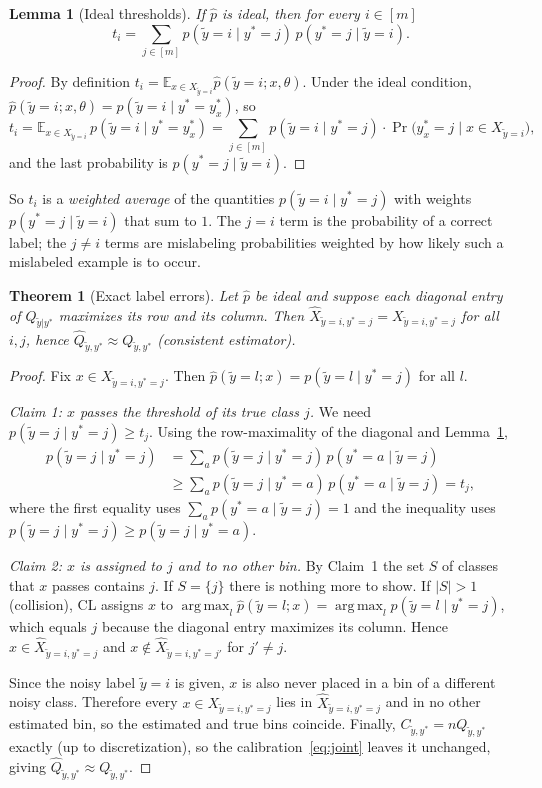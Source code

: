 \documentclass[11pt,a4paper]{report}
\newcommand{\Cyy}{C_{\tilde y,y^*}}
\newcommand{\E}{\mathbb{E}}
\newcommand{\argmax}{\operatorname*{arg\,max}}
\newcommand{\1}{\mathbf 1}
\theoremstyle{definition}
\theoremstyle{plain}
\newtheorem{lemma}[definition]{Lemma}
\newtheorem{theorem}[definition]{Theorem}
\theoremstyle{remark}
\begin{document}
\begin{lemma}[Ideal thresholds]\label{lem:thresh}
If $\hat p$ is ideal, then for every $i\in[m]$
\[
t_i=\sum_{j\in[m]}p(\tilde y=i\mid y^*=j)\,p(y^*=j\mid\tilde y=i).
\]
\end{lemma}
\begin{proof}
By definition $t_i=\E_{x\in X_{\tilde y=i}}\hat p(\tilde y=i;x,\theta)$. Under the ideal condition, $\hat p(\tilde y=i;x,\theta)=p(\tilde y=i\mid y^*=y^*_x)$, so
\[
t_i=\E_{x\in X_{\tilde y=i}}\,p(\tilde y=i\mid y^*=y^*_x)
=\sum_{j\in[m]}p(\tilde y=i\mid y^*=j)\cdot\Pr\bigl(y^*_x=j\mid x\in X_{\tilde y=i}\bigr),
\]
and the last probability is $p(y^*=j\mid\tilde y=i)$.
\end{proof}
So $t_i$ is a \emph{weighted average} of the quantities $p(\tilde y=i\mid y^*=j)$ with weights $p(y^*=j\mid\tilde y=i)$ that sum to $1$. The $j=i$ term is the probability of a correct label; the $j\ne i$ terms are mislabeling probabilities weighted by how likely such a mislabeled example is to occur.

\begin{theorem}[Exact label errors]\label{thm:exact}
Let $\hat p$ be ideal and suppose each diagonal entry of $Q_{\tilde y|y^*}$ maximizes its row and its column. Then $\hat X_{\tilde y=i,y^*=j}=X_{\tilde y=i,y^*=j}$ for all $i,j$, hence $\hat Q_{\tilde y,y^*}\approx Q_{\tilde y,y^*}$ (consistent estimator).
\end{theorem}
\begin{proof}
Fix $x\in X_{\tilde y=i,y^*=j}$. Then $\hat p(\tilde y=l;x)=p(\tilde y=l\mid y^*=j)$ for all $l$.

\emph{Claim 1: $x$ passes the threshold of its true class $j$.} We need $p(\tilde y=j\mid y^*=j)\ge t_j$. Using the row-maximality of the diagonal and Lemma~\ref{lem:thresh},
\begin{align*}
p(\tilde y=j\mid y^*=j)&=\sum_{a}p(\tilde y=j\mid y^*=j)\,p(y^*=a\mid\tilde y=j)\\
&\ge\sum_a p(\tilde y=j\mid y^*=a)\,p(y^*=a\mid\tilde y=j)=t_j,
\end{align*}
where the first equality uses $\sum_a p(y^*=a\mid\tilde y=j)=1$ and the inequality uses $p(\tilde y=j\mid y^*=j)\ge p(\tilde y=j\mid y^*=a)$.

\emph{Claim 2: $x$ is assigned to $j$ and to no other bin.} By Claim~1 the set $S$ of classes that $x$ passes contains $j$. If $S=\{j\}$ there is nothing more to show. If $|S|>1$ (collision), CL assigns $x$ to $\argmax_l\hat p(\tilde y=l;x)=\argmax_l p(\tilde y=l\mid y^*=j)$, which equals $j$ because the diagonal entry maximizes its column. Hence $x\in\hat X_{\tilde y=i,y^*=j}$ and $x\notin\hat X_{\tilde y=i,y^*=j'}$ for $j'\ne j$.

Since the noisy label $\tilde y=i$ is given, $x$ is also never placed in a bin of a different noisy class. Therefore every $x\in X_{\tilde y=i,y^*=j}$ lies in $\hat X_{\tilde y=i,y^*=j}$ and in no other estimated bin, so the estimated and true bins coincide. Finally, $\Cyy=nQ_{\tilde y,y^*}$ exactly (up to discretization), so the calibration~\eqref{eq:joint} leaves it unchanged, giving $\hat Q_{\tilde y,y^*}\approx Q_{\tilde y,y^*}$.
\end{proof}
\end{document}
